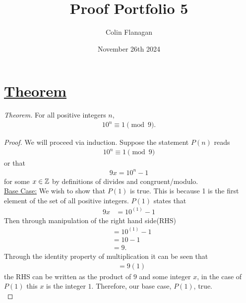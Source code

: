 \documentclass{article}
\title{Proof Portfolio 5}
\author{Colin Flanagan}
\date{November 26th 2024}
\begin{document}
\maketitle

\section*{\underline{Theorem}} 

\textit{Theorem.} For all positive integers $n$,
\begin{align*}
    10^n \equiv 1 \pmod{9}.
\end{align*}

\begin{proof}
     We will proceed via induction. Suppose the statement $P(n)$ reads 
 \begin{align*}
     10^n \equiv 1 \pmod{9}
 \end{align*}
 or that 
 \begin{align*}
     9x = 10^n - 1
 \end{align*}
 for some $x \in \Bbb{Z}$ by definitions of divides and congruent/modulo.\\
 
\underline{Base Case:} We wish to show that $P(1)$ is true. This is because 1 is the first element of the set of all positive integers. $P(1)$ states that 
\begin{align*}
    9x &= 10^{(1)} - 1
\end{align*}
Then through manipulation of the right hand side(RHS)
\begin{align*}
    &= 10^{(1)} - 1\\
    &= 10 -1 \\
    &= 9. 
\end{align*}
Through the identity property of multiplication it can be seen that 
\begin{align*}
    &= 9(1)
\end{align*}
the RHS can be written as the product of $9$ and some integer $x$, in the case of $P(1)$ this $x$ is the integer $1$. Therefore, our base case, $P(1)$, true.\\


\end{proof}
\end{document}
